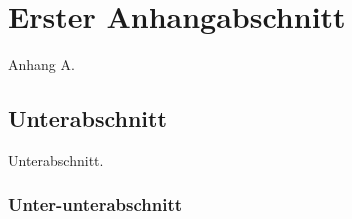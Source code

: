 \chapter{Erster Anhangabschnitt}

Anhang A.

\section{Unterabschnitt}

Unterabschnitt.

\subsection{Unter-unterabschnitt}